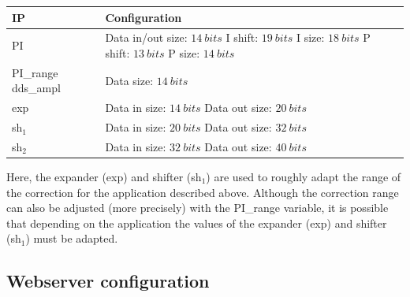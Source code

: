 \documentclass[12pt,oneside]{article}
\begin{document}
\begin{center}
		\begin{tabular}{|>{\centering\arraybackslash}m{.3\linewidth} | >{\centering\arraybackslash}m{.3\linewidth} |}
		\hline
		IP & Configuration \\
		\hline
		PI&Data in/out size: $14~bits$ \newline I shift: $19~bits$ \newline I size: $18~bits$ \newline P shift: $13~bits$ \newline P size: $14~bits$ \\
		\hline
		\hspace{0.65cm} PI\_range \newline dds\_ampl& Data size: $14~bits$\\
		\hline
		exp& Data in size: $14~bits$ \newline Data out size: $20~bits$\\
		\hline
		sh$_1$& Data in size: $20~bits$ \newline Data out size: $32~bits$\\
		\hdashline
		sh$_2$& Data in size: $32~bits$ \newline Data out size: $40~bits$\\
		\hline
		\end{tabular}
\end{center}
\vspace{0.2cm}

Here, the expander (exp) and shifter (sh$_1$) are used to roughly adapt the range of the correction for the application described above. Although the correction range can also be adjusted (more precisely) with the PI\_range variable, it is possible that depending on the application the values of the expander (exp) and shifter (sh$_1$) must be adapted.

\subsection{Webserver configuration}
\end{document}
